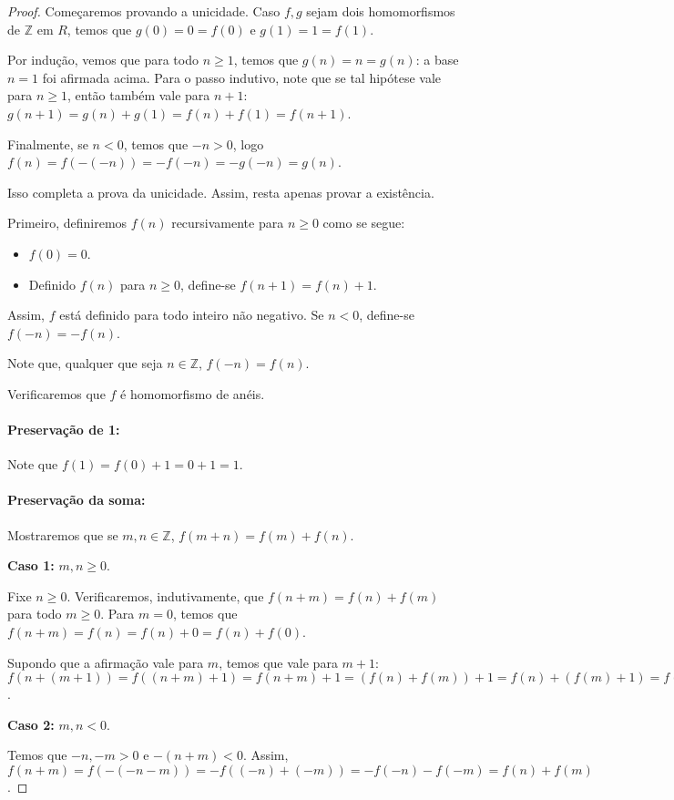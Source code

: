 \begin{proof}
Começaremos provando a unicidade.
Caso $f, g$ sejam dois homomorfismos de $\mathbb Z$ em $R$, temos que $g(0)=0=f(0)$ e $g(1)=1=f(1)$.

Por indução, vemos que para todo $n\geq 1$, temos que $g(n)=n=g(n)$: a base $n=1$ foi afirmada acima.
Para o passo indutivo, note que se tal hipótese vale para $n\geq 1$, então também vale para $n+1$: $g(n+1)=g(n)+g(1)=f(n)+f(1)=f(n+1)$.

Finalmente, se $n<0$, temos que $-n>0$, logo $f(n)=f(-(-n))=-f(-n)=-g(-n)=g(n)$.

Isso completa a prova da unicidade.
Assim, resta apenas provar a existência.

Primeiro, definiremos $f(n)$ recursivamente para $n\geq 0$ como se segue:

\begin{itemize}
    \item $f(0)=0$.
    \item Definido $f(n)$ para $n\geq 0$, define-se $f(n+1)=f(n)+1$.
\end{itemize}
Assim, $f$ está definido para todo inteiro não negativo. Se $n<0$, define-se $f(-n)=-f(n)$.

Note que, qualquer que seja $n \in \mathbb Z$, $f(-n)=f(n)$.

Verificaremos que $f$ é homomorfismo de anéis.

\paragraph{Preservação de 1:} Note que $f(1)=f(0)+1=0+1=1$.

\paragraph{Preservação da soma:}
Mostraremos que se $m, n \in \mathbb Z$, $f(m+n)=f(m)+f(n)$.

\textbf{Caso 1:} $m, n\geq 0$.

Fixe $n\geq 0$.
Verificaremos, indutivamente, que $f(n+m)=f(n)+f(m)$ para todo $m\geq 0$.
Para $m=0$, temos que $f(n+m)=f(n)=f(n)+0=f(n)+f(0)$.

Supondo que a afirmação vale para $m$, temos que vale para $m+1$:
$f(n+(m+1))=f((n+m)+1)=f(n+m)+1=(f(n)+f(m))+1=f(n)+(f(m)+1)=f(n)+f(m+1)$.

\textbf{Caso 2:} $m, n<0$.

Temos que $-n, -m>0$ e $-(n+m)<0$. Assim, $f(n+m)=f(-(-n-m))=-f((-n)+(-m))=-f(-n)-f(-m)=f(n)+f(m)$.


\end{proof}
